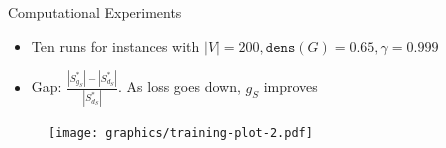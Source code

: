 \documentclass{beamer}
\newcommand{\backupend}{
   \setcounter{framenumber}{\value{finalframe}}
}
\begin{document}
\begin{frame}{Computational Experiments}
    \begin{itemize}
        \item Ten runs for instances with $|V| = 200, \mathtt{dens}(G) = 0.65, \gamma=0.999$
        \item Gap: $\frac{|S^*_{g_S}| - |S^*_{d_S}|}{|S^*_{d_S}|}$. As loss goes down, $g_S$ improves
    \end{itemize} 
    \begin{figure}
        \centering
        \texttt{[image: graphics/training-plot-2.pdf]}
    \end{figure}
\end{frame}



\backupend
\end{document}

